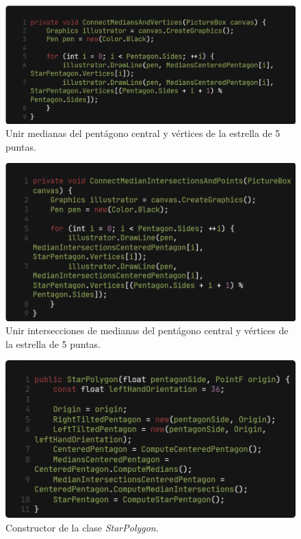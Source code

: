 \documentclass[oneside, a4paper]{article}
\begin{document}
            \begin{figure}[H]
                \centering
                \includegraphics[width=\textwidth]{connect_medians_and_vertices.png}
                \caption{Unir medianas del pentágono central y vértices de la estrella de 5 puntas.}
                \label{fig:connect_medians_and_vertices}
            \end{figure}

            \begin{figure}[H]
                \centering
                \includegraphics[width=\textwidth]{connect_median_intersections_and_points.png}
                \caption{Unir intersecciones de medianas del pentágono central y vértices de la estrella de 5 puntas.}
                \label{fig:connect_median_intersections_and_points}
            \end{figure}

            \begin{figure}[H]
                \centering
                \includegraphics[width=\textwidth]{star_polygon_constructor.png}
                \caption{Constructor de la clase \textit{StarPolygon}.}
                \label{fig:star_polygon_constructor}
            \end{figure}
\end{document}
